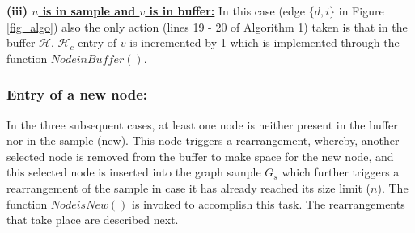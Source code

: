 \noindent\textbf{(iii) \underline{$u$ is in sample and $v$ is in buffer:}} 
In this case (edge $\{d,i\}$ in Figure \ref{fig_algo}) also the only action (lines 19 - 20 of Algorithm 1) taken is that in the buffer $\mathcal{H}$, $\mathcal{H}_c$ entry of $v$ is incremented by 1 which is implemented through the function $NodeinBuffer()$.

\subsubsection{Entry of a new node:} In the three subsequent cases, at least one node is neither present in the buffer nor in the sample (new). This node triggers a rearrangement, whereby, another selected node is removed from the buffer to make space for the new node, and this selected node is inserted into the graph sample $G_s$  which further triggers a rearrangement of the sample in case it has already reached its size limit ($n$). The function $NodeisNew()$ is invoked to accomplish this task. The rearrangements that take place are described next.

